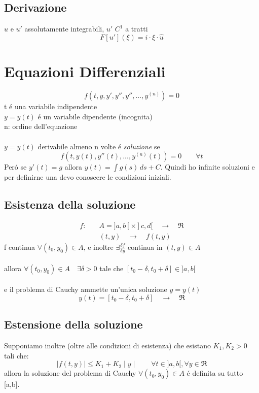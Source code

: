 \documentclass[a4paper,10pt,italian]{article}
\begin{document}
\subsection{Derivazione}
$u$ e $u'$ assolutamente integrabili, $u'$ $C^1$ a tratti
$$ F[u'](\xi) = i\cdot \xi \cdot \hat u $$

\section{Equazioni Differenziali}
$$ f(t, y, y', y'', y'', ..., y^{(n)}) = 0 $$
t \'e una variabile indipendente \\
$y = y(t)$ \'e un variabile dipendente (incognita) \\
n: ordine dell'equazione \\ \\
$y=y(t)$ derivabile almeno n volte \'e \emph{soluzione} se
$$ f(t, y(t), y''(t), ..., y^{(n)}(t)) = 0 \qquad \forall t $$
Per\'o se $y'(t) = g$ allora $y(t)=\int g(s)\,ds + C$. Quindi ho infinite soluzioni e per definirne una devo conoscere le condizioni iniziali.

\subsection{Esistenza della soluzione}
\begin{align*}
f:\quad &A=]a,b[\times ]c,d[ \quad \rightarrow \quad \Re \\
&(t,y) \quad \rightarrow \quad f(t,y)
\end{align*}
f continua $\forall (t_0, y_0)\in A$, e inoltre $\exists \frac{\delta f}{\delta y}$ continua in $(t,y)\in A$ \\ \\
allora $\forall(t_0, y_0)\in A \quad \exists \delta >0$ tale che $[t_0 - \delta, t_0 + \delta]\in]a,b[$ \\ \\
e il problema di Cauchy ammette un'unica soluzione $y=y(t)$
$$ y(t) = [t_0-\delta, t_0+\delta] \quad \rightarrow \quad \Re $$

\subsection{Estensione della soluzione}
Supponiamo inoltre (oltre alle condizioni di esistenza) che esistano $K_1, K_2 >0$ tali che:
$$ \mid f(t,y) \mid \leq K_1 + K_2\mid y \mid \qquad \forall t \in ]a,b[, \forall y \in \Re$$
allora la soluzione del problema di Cauchy $\forall (t_0, y_0) \in A$ \'e definita su tutto [a,b].
\end{document}
